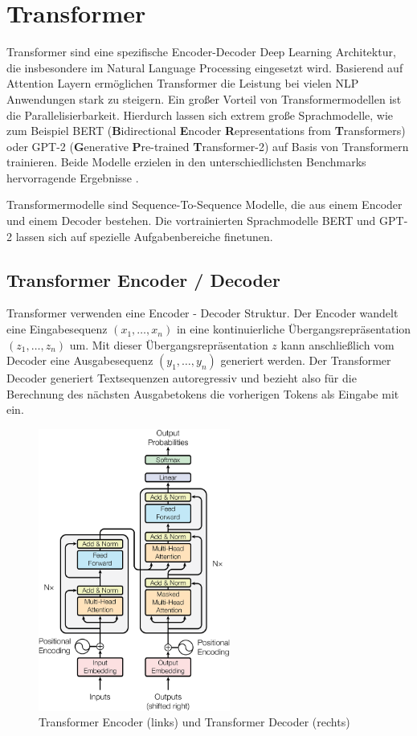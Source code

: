 \section{Transformer}\raggedbottom \label{transformer}
Transformer sind eine spezifische Encoder-Decoder Deep Learning Architektur, die insbesondere im Natural Language Processing eingesetzt wird. 
Basierend auf Attention Layern ermöglichen Transformer die Leistung bei vielen NLP Anwendungen stark zu steigern. 
Ein großer Vorteil von Transformermodellen ist die Parallelisierbarkeit. 
Hierdurch lassen sich extrem große Sprachmodelle, wie zum Beispiel BERT (\textbf{B}idirectional \textbf{E}ncoder \textbf{R}epresentations from \textbf{T}ransformers) oder GPT-2 (\textbf{G}enerative \textbf{P}re-trained \textbf{T}ransformer-2) auf Basis von Transformern trainieren. 
Beide Modelle erzielen in den unterschiedlichsten Benchmarks hervorragende Ergebnisse \citep{DBLP:journals/corr/abs-1810-04805}.

Transformermodelle sind Sequence-To-Sequence Modelle, die aus einem Encoder und einem Decoder bestehen.
Die vortrainierten Sprachmodelle BERT und GPT-2 lassen sich auf spezielle Aufgabenbereiche finetunen.


\subsection{Transformer Encoder / Decoder}
Transformer verwenden eine Encoder - Decoder Struktur. Der Encoder wandelt eine Eingabesequenz $(x_1,\ldots,x_n)$ in eine kontinuierliche Übergangsrepräsentation $(z_1, \ldots, z_n)$ um. 
Mit dieser Übergangsrepräsentation $z$ kann anschließlich vom Decoder eine Ausgabesequenz $(y_1, \ldots, y_n)$ generiert werden.
Der Transformer Decoder generiert Textsequenzen autoregressiv und bezieht also für die Berechnung des nächsten Ausgabetokens die vorherigen Tokens als Eingabe mit ein.


\begin{figure}[h]
    
    \centering
    \includegraphics[width=6.3cm]{bilder/Transformer-Encoder-Decoder}
    \caption{Transformer Encoder (links) und Transformer Decoder (rechts) \citep{AttentionIALYN}}
    \label{transformerfig}
\end{figure}

